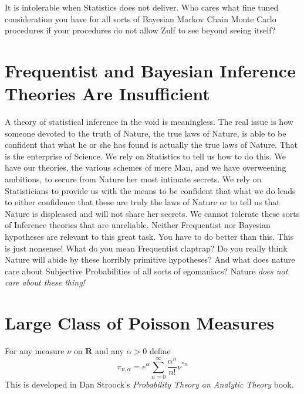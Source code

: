 \documentclass{amsart}
\begin{document}
It is intolerable when Statistics does not deliver.  Who cares what fine tuned consideration you have for all sorts of Bayesian Markov Chain Monte Carlo procedures if your procedures do not allow Zulf to see beyond seeing itself?

\section{Frequentist and Bayesian Inference Theories Are Insufficient}

A theory of statistical inference in the void is meaningless.  The real issue is how someone devoted to the truth of Nature, the true laws of Nature, is able to be confident that what he or she has found is actually the true laws of Nature.  That is the enterprise of Science.  We rely on Statistics to tell us how to do this.  We have our theories, the various schemes of mere Man, and we have overweening ambitions, to secure from Nature her most intimate secrets.  We rely on Statisticians to provide us with the means to be confident that what we do leads to either confidence that these are truly the laws of Nature or to tell us that Nature is displeased and will not share her secrets.  We cannot tolerate these sorts of Inference theories that are unreliable.  Neither Frequentist nor Bayesian hypotheses are relevant to this great task.  You have to do better than this.  This is just nonsense!  What do you mean Frequentist claptrap?  Do you really think Nature will abide by these horribly primitive hypotheses?  And what does nature care about Subjective Probabilities of all sorts of egomaniacs?  Nature {\em does not care about these thing!}

\section{Large Class of Poisson Measures}

For any measure $\nu$ on $\mathbf{R}$ and any $\alpha>0$ define
\begin{equation}
\pi_{\nu,\alpha} = e^{\alpha}\sum_{n=0}^\infty \frac{\alpha^n}{n!} \nu^{*n}
\end{equation}
This is developed in Dan Stroock's {\em Probability Theory an Analytic Theory} book.  
\end{document}
